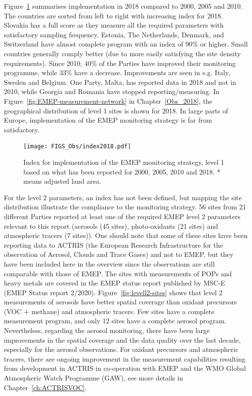 Figure~\ref{fig:Index-for-implementation} summarises implementation in 2018 compared to 2000, 2005 and 2010. The countries are sorted from left to right with increasing index for 2018. Slovakia has a full score as they measure all the required parameters with satisfactory sampling frequency. Estonia, The Netherlands, Denmark, and Switzerland have almost complete program with an index of 90\% or higher. Small countries generally comply better (due to more easily satisfying the site density requirements). Since 2010, 40\% of the Parties have improved their monitoring programme,  while 33\% have a decrease. Improvements are seen in e.g. Italy, Sweden and Belgium.  One Party, Malta, has reported data in 2018 and not in 2010, while Georgia and Romania have stopped reporting/measuring. In Figure~\ref{fig:EMEP-measurement-network} in Chapter~\ref{Obs_2018}, the geographical distribution of level 1 sites is shown for 2018.  
In large parts of Europe, implementation of the EMEP monitoring strategy is far from satisfactory. 

\begin{figure}
	\centering
	\texttt{[image: FIGS\_Obs/index2018.pdf]}
	\caption{\label{fig:Index-for-implementation}Index for implementation of the EMEP monitoring strategy, level 1 based on what has been reported for 2000, 2005, 2010 and 2018. {*} means adjusted land area.}
\end{figure}

For the level 2 parameters, an index has not been defined, but mapping the site distribution illustrate the compliance to the monitoring strategy. 56 sites from 21 different Parties reported  at least one of the required  EMEP level 2 parameters relevant to this report (aerosols (45 sites), photo-oxidants (21 sites) and atmospheric tracers (7 sites)). One should note that some of these sites have been reporting data to ACTRIS (the European Research Infrastructure for the observation of Aerosol, Clouds and Trace Gases) and not to EMEP, but they have been included here in the overview since the observations are still comparable with those of EMEP. The sites with measurements of POPs and heavy metals are covered in the EMEP status report published by MSC-E (EMEP Status report 2/2020).  Figure~\ref{fig:levell2-sites} shows that level 2 measurements of aerosols have better spatial coverage than oxidant precursors (VOC + methane) and atmospheric tracers. Few sites have a complete measurement program, and only 12 sites have a complete aerosol program. Nevertheless, regarding the aerosol monitoring, there have been large improvements in the spatial coverage and the data quality over the last decade, especially for the aerosol observations. For oxidant precursors and atmospheric tracers, there are ongoing improvement in the measurement capabilities resulting from development in ACTRIS in co-operation with EMEP and the WMO Global Atmospheric Watch Programme (GAW), see more details in Chapter~\ref{ch:ACTRISVOC}.


